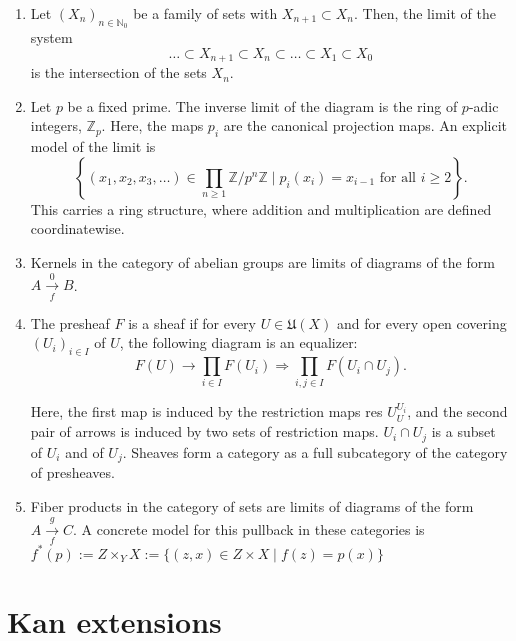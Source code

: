 \begin{example}[Limits]
    \begin{enumerate}
        \item Let $\left(X_n\right)_{n \in \mathbb{N}_0}$ be a family of sets with $X_{n+1} \subset X_n$. Then, the limit of the system
        $$
        \ldots \subset X_{n+1} \subset X_n \subset \ldots \subset X_1 \subset X_0
        $$
        is the intersection of the sets $X_n$.
        \item Let $p$ be a fixed prime. The inverse limit of the diagram
        is the ring of $p$-adic integers, $\mathbb{Z}_p$. Here, the maps $p_i$ are the canonical projection maps. An explicit model of the limit is
        $$
        \left\{\left(x_1, x_2, x_3, \ldots\right) \in \prod_{n \geq 1} \mathbb{Z} / p^n \mathbb{Z} \mid p_i\left(x_i\right)=x_{i-1} \text { for all } i \geq 2\right\} .
        $$
        This carries a ring structure, where addition and multiplication are defined coordinatewise.
        \item Kernels in the category of abelian groups are limits of diagrams of the form $A \underset{f}{\stackrel{0}{\longrightarrow}} B$.
        \item The presheaf $F$ is a sheaf if for every $U \in \mathfrak{U}(X)$ and for every open covering $\left(U_i\right)_{i \in I}$ of $U$, the following diagram is an equalizer:
        $$
        F(U) \longrightarrow \prod_{i \in I} F\left(U_i\right) \Longrightarrow \prod_{i, j \in I} F\left(U_i \cap U_j\right) .
        $$
        
        Here, the first map is induced by the restriction maps res $U_U^{U_i}$, and the second pair of arrows is induced by two sets of restriction maps. $U_i \cap U_j$ is a subset of $U_i$ and of $U_j$.
        Sheaves form a category as a full subcategory of the category of presheaves.
        \item Fiber products in the category of sets are limits of diagrams of the form $A \underset{f}{\stackrel{g}{\longrightarrow}} C$. A concrete model for this pullback in these categories is $f^*(p):=Z \times_Y X:=\{(z, x) \in Z \times X \mid f(z)=p(x)\}$
    \end{enumerate}
\end{example}




\section{Kan extensions}

